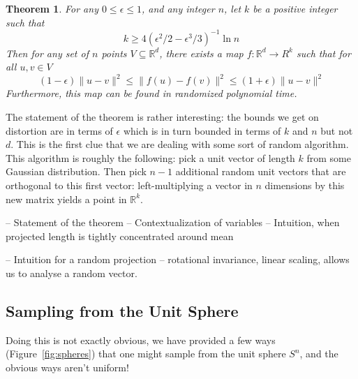 \documentclass[11pt]{article}
\newcommand{\arr}{\rightarrow}
\newcommand{\R}{\mathbb{R}}
\newtheorem{Thm}{Theorem}
\begin{document}
\begin{Thm}

  For any $0 \leq \epsilon \leq 1$, and any integer $n$, let $k$ be a positive
  integer such that
  \[ 
    k \geq 4(\epsilon^2/2 - \epsilon^3/3)^{-1} \ln n 
  \]
  Then for any set of $n$ points $V \subseteq \R^d$, there exists a map
  $f:\R^d \arr R^k$ such that for all $u, v \in V$
  \[
    (1-\epsilon)\|u - v\|^2 \leq \| f(u) - f(v) \|^2 \leq (1+\epsilon) \| u - v \|^2 
  \]
  Furthermore, this map can be found in randomized polynomial time.

\end{Thm}

The statement of the theorem is rather interesting: the bounds we get on
distortion are in terms of $\epsilon$ which is in turn bounded in terms of $k$
and $n$ but not $d$. This is the first clue that we are dealing with some sort
of random algorithm. This algorithm is roughly the following: pick a unit vector
of length $k$ from some Gaussian distribution. Then pick $n-1$ additional random
unit vectors that are orthogonal to this first vector: left-multiplying a vector
in $n$ dimensions by this new matrix yields a point in $\mathbb{R}^k$.

-- Statement of the theorem
-- Contextualization of variables
-- Intuition, when projected length is tightly concentrated around mean

-- Intuition for a random projection
-- rotational invariance, linear scaling, allows us to analyse a random vector.

\subsection{Sampling from the Unit Sphere}

Doing this is not exactly obvious, we have provided a few ways
(Figure~\ref{fig:spheres}) that one might sample from the unit sphere $S^n$, and
the obvious ways aren't uniform!
\end{document}
